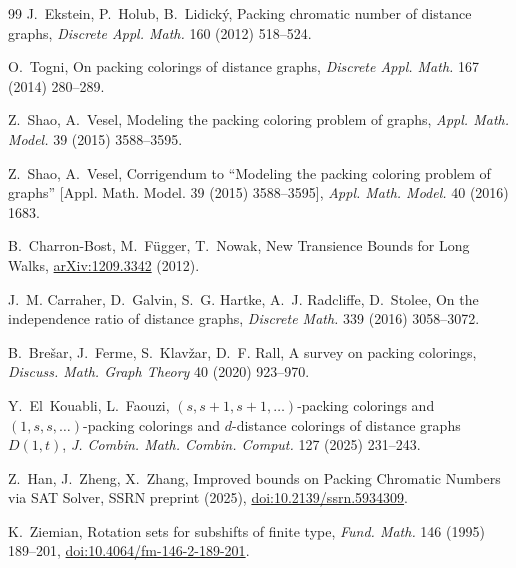 \documentclass[11pt,reqno]{amsart}
\theoremstyle{plain}
\theoremstyle{plain}
\theoremstyle{plain}
\begin{document}
\begin{thebibliography}{99}
J.~Ekstein, P.~Holub, B.~Lidick\'y,
\newblock Packing chromatic number of distance graphs,
\newblock \emph{Discrete Appl. Math.} 160 (2012) 518--524.

O.~Togni,
\newblock On packing colorings of distance graphs,
\newblock \emph{Discrete Appl. Math.} 167 (2014) 280--289.

Z.~Shao, A.~Vesel,
\newblock Modeling the packing coloring problem of graphs,
\newblock \emph{Appl. Math. Model.} 39 (2015) 3588--3595.

Z.~Shao, A.~Vesel,
\newblock Corrigendum to ``Modeling the packing coloring problem of graphs''
  [Appl. Math. Model. 39 (2015) 3588--3595],
\newblock \emph{Appl. Math. Model.} 40 (2016) 1683.

B.~Charron-Bost, M.~F\"ugger, T.~Nowak,
\newblock New Transience Bounds for Long Walks,
\newblock \href{https://arxiv.org/abs/1209.3342}{arXiv:1209.3342} (2012).

J.~M. Carraher, D.~Galvin, S.~G. Hartke, A.~J. Radcliffe, D.~Stolee,
\newblock On the independence ratio of distance graphs,
\newblock \emph{Discrete Math.} 339 (2016) 3058--3072.

B.~Bre\v{s}ar, J.~Ferme, S.~Klav\v{z}ar, D.~F. Rall,
\newblock A survey on packing colorings,
\newblock \emph{Discuss. Math. Graph Theory} 40 (2020) 923--970.

Y.~El~Kouabli, L.~Faouzi,
\newblock $(s,s+1,s+1,\dots)$-packing colorings and $(1,s,s,\dots)$-packing
  colorings and $d$-distance colorings of distance graphs $D(1,t)$,
\newblock \emph{J. Combin. Math. Combin. Comput.} 127 (2025) 231--243.

Z.~Han, J.~Zheng, X.~Zhang,
\newblock Improved bounds on Packing Chromatic Numbers via SAT Solver,
\newblock SSRN preprint (2025),
\href{https://doi.org/10.2139/ssrn.5934309}{doi:10.2139/ssrn.5934309}.

K.~Ziemian,
\newblock Rotation sets for subshifts of finite type,
\newblock \emph{Fund. Math.} 146 (1995) 189--201,
\href{https://doi.org/10.4064/fm-146-2-189-201}{doi:10.4064/fm-146-2-189-201}.

\end{thebibliography}
\end{document}
